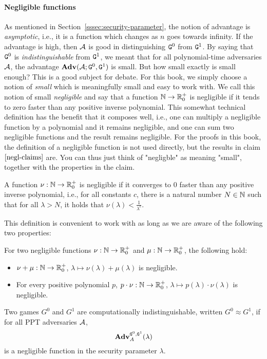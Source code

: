 \paragraph{Negligible functions}
As mentioned in Section~\ref{sssec:security-parameter}, the notion of advantage is \emph{asymptotic}, i.e., it is a function
which changes as $n$ goes towards infinity. If the advantage is high, then $\mathcal{A}$ is good in distinguishing $\text{\texttt{G}}^0$ from $\text{\texttt{G}}^1$. By saying that $\text{\texttt{G}}^0$ is \emph{indistinguishable} from $\text{\texttt{G}}^1$, we meant that for all polynomial-time adversaries $\mathcal{A}$, the advantage ${\mathbf{Adv}}(\mathcal{A};\text{\texttt{G}}^0,\text{\texttt{G}}^1)$ is small. But how small exactly is small enough? This is a good subject for debate. For this book, we simply choose a notion of \emph{small} which is meaningfully small and easy to work with. We call this notion of small \emph{negligible} and say that a function $\mathbb{N}\rightarrow \mathbb{R}_0^+$ is negligible if it tends to zero faster than any positive inverse polynomial. This somewhat technical definition has the benefit that it composes well, i.e., one can multiply a negligible function by a polynomial and it remains negligible, and one can sum two negligible functions and the result remains negligible. For the proofs in this book, the definition of a negligible function is not used directly, but the results in claim $\ref{negl-claims}$ are. You can thus just think of "negligble" as meaning "small", together with the properties in the claim. 

\begin{definition}
A function $\nu:\mathbb{N}\rightarrow\mathbb{R}_0^+$ is negligible if it converges to $0$ faster than any positive inverse polynomial, i.e., for all constants $c$, there is a natural number $N\in\mathbb{N}$ such that for all $\lambda>N$, it holds that $\nu(\lambda)<\frac{1}{\lambda^c}$.
\end{definition}
This definition is convenient to work with as long as we are aware of the following two properties:
\begin{claim}\label{negl-claims}
For two negligible functions $\nu:\mathbb{N}\rightarrow\mathbb{R}_0^+$ and $\mu:\mathbb{N}\rightarrow\mathbb{R}_0^+$, the following hold:
\begin{itemize}
\item $\nu+\mu:\mathbb{N}\rightarrow\mathbb{R}_0^+$, $\lambda\mapsto\nu(\lambda)+\mu(\lambda)$ is negligible.
\item For every positive polynomial $p$, $p\cdot\nu:\mathbb{N}\rightarrow\mathbb{R}_0^+$, $\lambda\mapsto p(\lambda)\cdot\nu(\lambda)$ is negligible.
\end{itemize}
\end{claim}




\begin{definition}
Two games $G^0$ and $G^1$ are computationally in\-distinguish\-able, written $G^0 \approx G^1$, if for all PPT adversaries $\mathcal{A}$,
\[\mathbf{Adv}^{\text{\texttt{G}}^0,\text{\texttt{G}}^1}_{A}(\lambda)\]
is a negligible function in the security parameter $\lambda$.
\end{definition}




